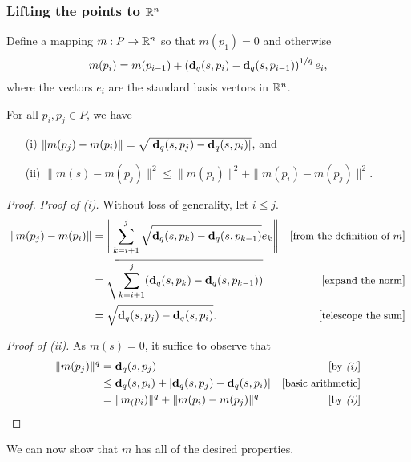 \subsubsection{Lifting the points to $\mathbb{R}^n$} %
\label{sec:lifting}
  
  Define a mapping $m: P \to \mathbb{R}^n$ so that $m(p_1) = 0$ and otherwise 
  \begin{equation}\label{eq:defn_of_m}
    m(p_i) = m(p_{i-1}) + \left(\mathbf{d}_q(s, p_i) - \mathbf{d}_q(s,
p_{i-1})\right)^{1/q} e_i,
  \end{equation}
  where the vectors $e_i$ are the standard basis vectors in $\mathbb{R}^n$.

  \begin{lemma}\label{lem:m_and_dist}
    For all $p_i, p_j\in P$, we have 
    \begin{enumerate}
      \item[(i)] $\|m(p_j) - m(p_i)\| = \sqrt{|\mathbf{d}_q(s,p_j) - \mathbf{d}_q(s,p_i)|}$, and
      \item[(ii)]$\|m(s) - m(p_j)\|^2 \le \|m(p_i)\|^2 + \|m(p_i) - m(p_j)\|^2$.
    \end{enumerate}
  \end{lemma}
  \begin{proof}
    \emph{Proof of (i).}
    Without loss of generality, let $i \le j$.
    \begin{align*}
      \|m(p_j) - m(p_i)\| &= \left\|\sum_{k=i+1}^j \sqrt{\mathbf{d}_q(s, p_k) - \mathbf{d}_q(s, p_{k-1})} e_k \right\| &\left[\text{\small{from the definition of $m$}}\right]\\
      &= \sqrt{\sum_{k=i+1}^j (\mathbf{d}_q(s, p_k) - \mathbf{d}_q(s, p_{k-1}))}&\left[\text{\small{expand the norm}}\right]\\
      &= \sqrt{\mathbf{d}_q(s, p_j) - \mathbf{d}_q(s, p_i)}. &\left[\text{\small{telescope the sum}}\right]
    \end{align*}

    \noindent\emph{Proof of (ii).}
    As $m(s) = 0$, it suffice to observe that
    \begin{align*}
      \|m(p_j)\|^q
        &= \mathbf{d}_q(s, p_j) &\left[\text{\small{by \emph{(i)}}}\right]\\
        &\le \mathbf{d}_q(s, p_i) + |\mathbf{d}_q(s,p_j) - \mathbf{d}_q(s,p_i)|&\left[\text{\small{basic arithmetic}}\right]\\
        &= \|m_(p_i)\|^q + \|m(p_i) - m(p_j)\|^q &\left[\text{\small{by \emph{(i)}}}\right]
    \end{align*}
  \end{proof}

  We can now show that $m$ has all of the desired properties.

